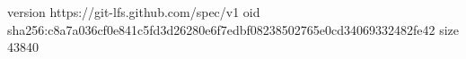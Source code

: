 version https://git-lfs.github.com/spec/v1
oid sha256:c8a7a036cf0e841c5fd3d26280e6f7edbf08238502765e0cd34069332482fe42
size 43840
